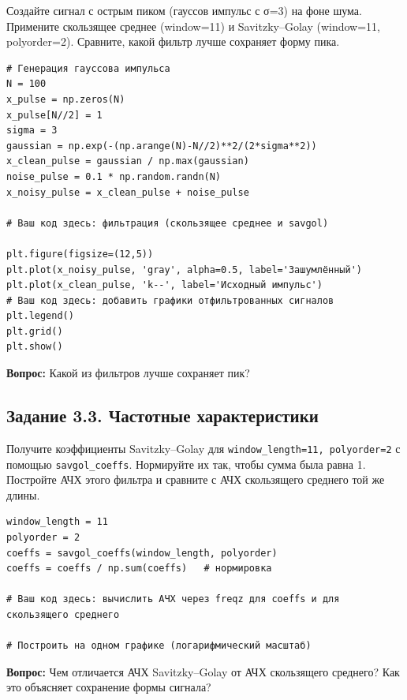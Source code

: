 \documentclass[12pt,a4paper,openany]{book}
\begin{document}
Создайте сигнал с острым пиком (гауссов импульс с σ=3) на фоне шума. Примените скользящее среднее (window=11) и Savitzky--Golay (window=11, polyorder=2). Сравните, какой фильтр лучше сохраняет форму пика.

\begin{Verbatim}[fontsize=\small, breaklines, breakanywhere, frame=single, framesep=2mm]
# Генерация гауссова импульса
N = 100
x_pulse = np.zeros(N)
x_pulse[N//2] = 1
sigma = 3
gaussian = np.exp(-(np.arange(N)-N//2)**2/(2*sigma**2))
x_clean_pulse = gaussian / np.max(gaussian)
noise_pulse = 0.1 * np.random.randn(N)
x_noisy_pulse = x_clean_pulse + noise_pulse

# Ваш код здесь: фильтрация (скользящее среднее и savgol)

plt.figure(figsize=(12,5))
plt.plot(x_noisy_pulse, 'gray', alpha=0.5, label='Зашумлённый')
plt.plot(x_clean_pulse, 'k--', label='Исходный импульс')
# Ваш код здесь: добавить графики отфильтрованных сигналов
plt.legend()
plt.grid()
plt.show()
\end{Verbatim}

\textbf{Вопрос:} Какой из фильтров лучше сохраняет пик?

\subsection*{Задание 3.3. Частотные характеристики}

Получите коэффициенты Savitzky--Golay для \texttt{window\_\allowbreak{}length=\allowbreak{}11,\allowbreak{}\ polyorder=\allowbreak{}2} с помощью \texttt{savgol\_\allowbreak{}coeffs}. Нормируйте их так, чтобы сумма была равна 1. Постройте АЧХ этого фильтра и сравните с АЧХ скользящего среднего той же длины.

\begin{Verbatim}[fontsize=\small, breaklines, breakanywhere, frame=single, framesep=2mm]
window_length = 11
polyorder = 2
coeffs = savgol_coeffs(window_length, polyorder)
coeffs = coeffs / np.sum(coeffs)   # нормировка

# Ваш код здесь: вычислить АЧХ через freqz для coeffs и для скользящего среднего

# Построить на одном графике (логарифмический масштаб)
\end{Verbatim}

\textbf{Вопрос:} Чем отличается АЧХ Savitzky--Golay от АЧХ скользящего среднего? Как это объясняет сохранение формы сигнала?
\end{document}
